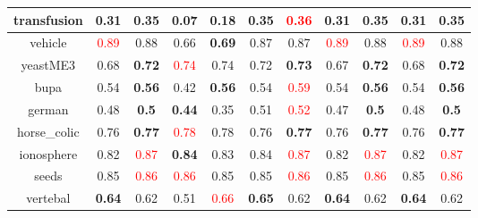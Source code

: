 \documentclass{article}%
\begin{document}
\begin{tabular}{c|cccccccccc}
\hline%
transfusion&0.31&\textbf{0.35}&0.07&\textbf{0.18}&0.35&\textcolor{red}{ 
0.36
}&0.31&\textbf{0.35}&0.31&\textbf{0.35}\\%
\hline%
vehicle&\textcolor{red}{ 
0.89
}&0.88&0.66&\textbf{0.69}&0.87&0.87&\textcolor{red}{ 
0.89
}&0.88&\textcolor{red}{ 
0.89
}&0.88\\%
\hline%
yeastME3&0.68&\textbf{0.72}&\textcolor{red}{ 
0.74
}&0.74&0.72&\textbf{0.73}&0.67&\textbf{0.72}&0.68&\textbf{0.72}\\%
\hline%
bupa&0.54&\textbf{0.56}&0.42&\textbf{0.56}&0.54&\textcolor{red}{ 
0.59
}&0.54&\textbf{0.56}&0.54&\textbf{0.56}\\%
\hline%
german&0.48&\textbf{0.5}&\textbf{0.44}&0.35&0.51&\textcolor{red}{ 
0.52
}&0.47&\textbf{0.5}&0.48&\textbf{0.5}\\%
\hline%
horse\_colic&0.76&\textbf{0.77}&\textcolor{red}{ 
0.78
}&0.78&0.76&\textbf{0.77}&0.76&\textbf{0.77}&0.76&\textbf{0.77}\\%
\hline%
ionosphere&0.82&\textcolor{red}{ 
0.87
}&\textbf{0.84}&0.83&0.84&\textcolor{red}{ 
0.87
}&0.82&\textcolor{red}{ 
0.87
}&0.82&\textcolor{red}{ 
0.87
}\\%
\hline%
seeds&0.85&\textcolor{red}{ 
0.86
}&\textcolor{red}{ 
0.86
}&0.85&0.85&\textcolor{red}{ 
0.86
}&0.85&\textcolor{red}{ 
0.86
}&0.85&\textcolor{red}{ 
0.86
}\\%
\hline%
vertebal&\textbf{0.64}&0.62&0.51&\textcolor{red}{ 
0.66
}&\textbf{0.65}&0.62&\textbf{0.64}&0.62&\textbf{0.64}&0.62\\%
\hline%
\end{tabular}

%
\end{document}
